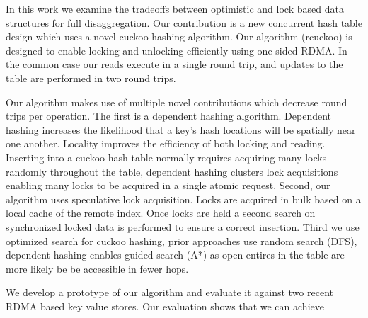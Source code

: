 
In this work we examine the tradeoffs between optimistic and
lock based data structures for full disaggregation. Our
contribution is a new concurrent hash table design which
uses a novel cuckoo hashing algorithm. Our algorithm
(rcuckoo) is designed to enable locking and unlocking
efficiently using one-sided RDMA. In the common case our
reads execute in a single round trip, and updates to the
table are performed in two round trips. 

Our algorithm makes use of multiple novel contributions
which decrease round trips per operation. The first is a
dependent hashing algorithm. Dependent hashing increases the
likelihood that a key's hash locations will be spatially
near one another. Locality improves the efficiency of both
locking and reading. Inserting into a cuckoo hash table
normally requires acquiring many locks randomly throughout
the table, dependent hashing clusters lock acquisitions
enabling many locks to be acquired in a single atomic
request. Second, our algorithm uses speculative lock
acquisition. Locks are acquired in bulk based on a local
cache of the remote index. Once locks are held a second
search on synchronized locked data is performed to ensure a
correct insertion. Third we use optimized search for cuckoo
hashing, prior approaches use random search (DFS), dependent
hashing enables guided search (A*) as open entires in the
table are more likely be be accessible in fewer hops.


We develop a prototype of our algorithm and evaluate it
against two recent RDMA based key value stores. Our
evaluation shows that we can achieve ~